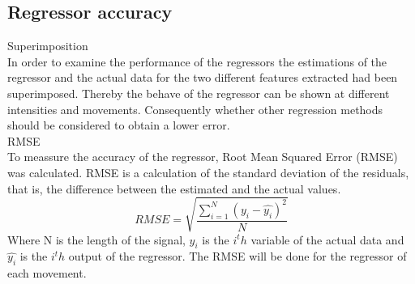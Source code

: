 	\subsection{Regressor accuracy}
	Superimposition\\
	In order to examine the performance of the regressors the estimations of the regressor and the actual data for the two different features extracted had been superimposed. Thereby the behave of the regressor can be shown at different intensities and movements. Consequently whether other regression methods should be considered to obtain a lower error.\\
	RMSE\\
	To meassure the accuracy of the regressor, Root Mean Squared Error (RMSE) was calculated. RMSE is a calculation of the standard deviation of the residuals, that is, the difference between the estimated and the actual values.
	\begin{equation}
	RMSE = \sqrt{\frac{\sum\limits_{i=1}^N(y_i - \hat{y_i})^2}{N}}
	\end{equation}
	Where N is the length of the signal, $y_i$ is the $i^th$ variable of the actual data and $\hat{y_i}$ is the $i^th$ output of the regressor. The RMSE will be done for the regressor of each movement.\\
	
	
	
	
